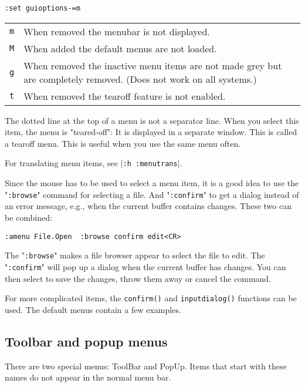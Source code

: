 \begin{Verbatim}[samepage=true]
 :set guioptions-=m
\end{Verbatim}
 
\begin{center} \begin{tabularx} {0.75\textwidth} {l X}
				\texttt{m} & When removed the menubar is not displayed. \\
				\texttt{M} & When added the default menus are not loaded. \\
				\texttt{g} & When removed the inactive menu items are not made grey but are completely removed.  (Does not work on all systems.) \\
				\texttt{t} & When removed the tearoff feature is not enabled. \\
\end{tabularx} \end{center}

The dotted line at the top of a menu is not a separator line.
When you select this item, the menu is "teared-off": It is displayed in a separate window.
This is called a tearoff menu.
This is useful when you use the same menu often.

For translating menu items, see |\texttt{:h :menutrans}|.

Since the mouse has to be used to select a menu item, it is a good idea to use the "\texttt{:browse}" command for selecting a file.
And "\texttt{:confirm}" to get a dialog instead of an error message, e.g., when the current buffer contains changes.
These two can be combined:

\begin{Verbatim}[samepage=true]
 :amenu File.Open  :browse confirm edit<CR>
\end{Verbatim}

The "\texttt{:browse}" makes a file browser appear to select the file to edit.
The "\texttt{:confirm}" will pop up a dialog when the current buffer has changes.
You can then select to save the changes, throw them away or cancel the command.

For more complicated items, the \texttt{confirm()} and \texttt{inputdialog()} functions can be used.
The default menus contain a few examples.
\subsection{Toolbar and popup menus}
There are two special menus: ToolBar and PopUp.
Items that start with these names do not appear in the normal menu bar.

